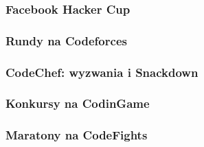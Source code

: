 \subsubsection{Facebook Hacker Cup}

\subsubsection{Rundy na Codeforces}

\subsubsection{CodeChef: wyzwania i Snackdown}

\subsubsection{Konkursy na CodinGame}

\subsubsection{Maratony na CodeFights}

